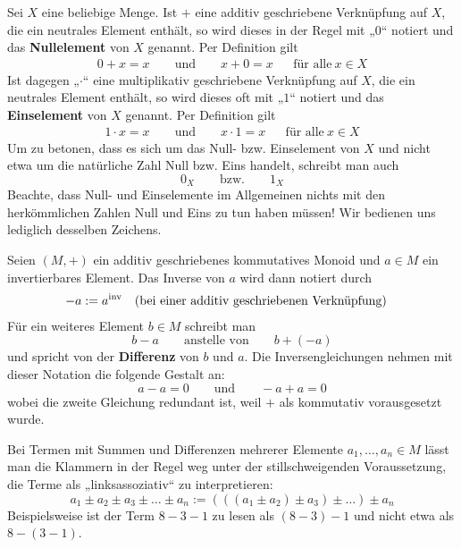 \begin{nota}  
    Sei $X$ eine beliebige Menge. Ist $+$ eine additiv geschriebene Verknüpfung auf $X$, die ein neutrales Element enthält, so wird dieses in der Regel mit „$0$“ notiert und das \textbf{Nullelement} von $X$ genannt. Per Definition gilt
    \begin{align*}
        0 + x = x \qquad\text{und}\qquad x+0= x && \text{für alle}\ x\in X
    \end{align*}
    Ist dagegen „$\cdot$“ eine multiplikativ geschriebene Verknüpfung auf $X$, die ein neutrales Element enthält, so wird dieses oft mit „$1$“ notiert und das \textbf{Einselement} von $X$ genannt. Per Definition gilt
    \begin{align*}
        1 \cdot x = x \qquad\text{und}\qquad x\cdot 1= x && \text{für alle}\ x\in X
    \end{align*}
    Um zu betonen, dass es sich um das Null- bzw. Einselement von $X$ und nicht etwa um die natürliche Zahl Null bzw. Eins handelt, schreibt man auch
    \[ 0_X \qquad\text{bzw.}\qquad 1_X \]
    Beachte, dass Null- und Einselemente im Allgemeinen nichts mit den herkömmlichen Zahlen Null und Eins zu tun haben müssen! Wir bedienen uns lediglich desselben Zeichens.
\end{nota}


\begin{nota}[Differenzen] \label{differenz}
    Seien $(M,+)$ ein additiv geschriebenes kommutatives Monoid und $a\in M$ ein invertierbares Element. Das Inverse von $a$ wird dann notiert durch
    \begin{align*}
        -a & := a^{\mathrm{inv}} && (\text{bei einer additiv geschriebenen Verknüpfung})
    \end{align*}
    Für ein weiteres Element $b\in M$ schreibt man
        \[ b-a \qquad\text{anstelle von}\qquad b + (-a) \]
    und spricht von der \textbf{Differenz} von $b$ und $a$. Die Inversengleichungen nehmen mit dieser Notation die folgende Gestalt an:
        \[ a-a = 0 \qquad\text{und}\qquad -a+a = 0 \]
    wobei die zweite Gleichung redundant ist, weil $+$ als kommutativ vorausgesetzt wurde.
    
    Bei Termen mit Summen und Differenzen mehrerer Elemente $a_1,\dots , a_n\in M$ lässt man die Klammern in der Regel weg unter der stillschweigenden Voraussetzung, die Terme als „linksassoziativ“ zu interpretieren:
        \[ a_1 \pm a_2\pm a_3\pm\ldots\pm a_n := (((a_1\pm a_2)\pm a_3) \pm \ldots ) \pm a_n\]
    Beispielsweise ist der Term $8-3-1$ zu lesen als $(8-3)-1$ und nicht etwa als $8-(3-1)$.
\end{nota}


